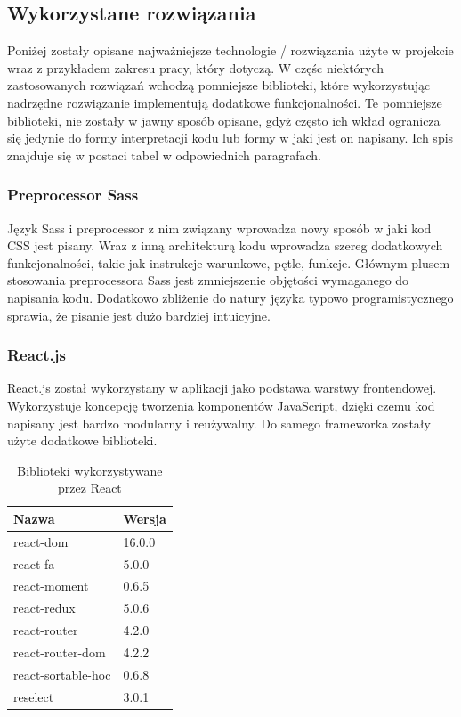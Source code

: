 \documentclass[eng,printmode]{mgr}
\begin{document}
\subsection{Wykorzystane rozwiązania}

Poniżej zostały opisane najważniejsze technologie / rozwiązania użyte w projekcie wraz z przykładem zakresu pracy, który dotyczą. W częśc niektórych zastosowanych rozwiązań wchodzą pomniejsze biblioteki, które wykorzystując nadrzędne rozwiązanie implementują dodatkowe funkcjonalności. Te pomniejsze biblioteki, nie zostały w jawny sposób opisane, gdyż często ich wkład ogranicza się jedynie do formy interpretacji kodu lub formy w jaki jest on napisany. Ich spis znajduje się w postaci tabel w odpowiednich paragrafach.

\subsubsection{Preprocessor Sass}
Język Sass i preprocessor z nim związany\cite{Sass} wprowadza nowy sposób w jaki kod CSS jest pisany. Wraz z inną architekturą kodu wprowadza szereg dodatkowych funkcjonalności, takie jak instrukcje warunkowe, pętle, funkcje. Głównym plusem stosowania preprocessora Sass jest zmniejszenie objętości wymaganego do napisania kodu. Dodatkowo zbliżenie do natury języka typowo programistycznego sprawia, że pisanie jest dużo bardziej intuicyjne.

\subsubsection{React.js}
React.js\cite{React} został wykorzystany w aplikacji jako podstawa warstwy frontendowej. Wykorzystuje koncepcję tworzenia komponentów JavaScript, dzięki czemu kod napisany jest bardzo modularny i reużywalny. Do samego frameworka zostały użyte dodatkowe biblioteki.

\begin{table}[H]
\begin{tabularx}{\textwidth}{|X|X|}
  \hline
    \textbf{Nazwa} & \textbf{Wersja} \\
  \hline
   	react-dom & 16.0.0 \\
  \hline
  	react-fa & 5.0.0 \\
   \hline
   	react-moment & 0.6.5 \\
   \hline
  	react-redux & 5.0.6 \\
   \hline
  	react-router & 4.2.0 \\
   \hline
  	react-router-dom & 4.2.2 \\
   \hline
  	react-sortable-hoc & 0.6.8 \\
   \hline
   reselect & 3.0.1 \\
   \hline
\end{tabularx}
\caption{Biblioteki wykorzystywane przez React}
\end{table}
\end{document}
